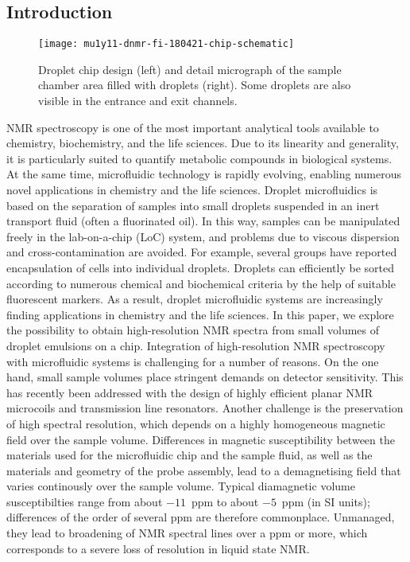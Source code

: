 
\subsection*{Introduction}

\begin{figure}
  \begin{center}
    \texttt{[image: mu1y11-dnmr-fi-180421-chip-schematic]}
  \end{center}
  \caption{Droplet chip design (left) and detail micrograph of the sample chamber
  area filled with droplets (right). Some droplets are also visible in the
  entrance and exit channels.}
  \label{fig:chip-design}
\end{figure}




NMR spectroscopy is one of the most important analytical tools
available to chemistry, biochemistry, and the life sciences.
Due to its linearity and generality, it is particularly suited
to quantify metabolic compounds in biological systems.\cite{Aranibar:2011dc,Wishart:2008ga}
At the same time, microfluidic
technology is rapidly evolving, enabling numerous novel applications in
chemistry and the life sciences. Droplet
microfluidics is based on the separation of samples into small droplets
suspended in an inert transport fluid (often a fluorinated oil).
\cite{Thorsen:2001gt,Anna:2003ci,Gunther:2006vd,Garstecki:2006tn}
In this way, samples can be manipulated freely in the lab-on-a-chip (LoC) system,
and problems due to viscous dispersion and cross-contamination
are avoided. For example, several groups have reported encapsulation
of cells into individual droplets.\cite{Lagus:2013bxb,Mazutis:2013ig}  Droplets can
efficiently be sorted according to numerous chemical and
biochemical criteria by the help of suitable fluorescent markers.
As a result, droplet microfluidic systems are increasingly finding applications
in chemistry\cite{Theberge:2012iq} and the
life sciences.\cite{Zhu:2013er,Mazutis:2013ig} In this paper, we explore
the possibility to obtain high-resolution NMR spectra from
small volumes of droplet emulsions on a chip.
Integration of high-resolution NMR spectroscopy with microfluidic systems is
challenging for a number of reasons.
On the one hand, small sample volumes place stringent demands on detector
sensitivity.\cite{Badilita:2011td,Zalesskiy:2014hi}
This has recently been addressed with the design of
highly efficient planar NMR microcoils \cite{Spengler:2016km} and
transmission line resonators.\cite{Finch:2016gv}
Another challenge is the preservation of high spectral
resolution, which depends on a highly homogeneous magnetic field
over the sample volume. Differences in magnetic susceptibility
between the materials used for the microfluidic chip
and the sample fluid, as well as the materials and geometry
of the probe assembly, lead to a demagnetising field
that varies continously over the sample volume. Typical diamagnetic
volume susceptibilties range from about
$-11$~ppm to about $-5$~ppm (in SI units);\cite{Kuchel:2003ip,Durrant:2003kv}
differences of the order of several ppm are therefore commonplace.
Unmanaged, they lead to
broadening of NMR spectral lines over a ppm or more, which
corresponds to a severe loss of resolution in  liquid
state NMR.

